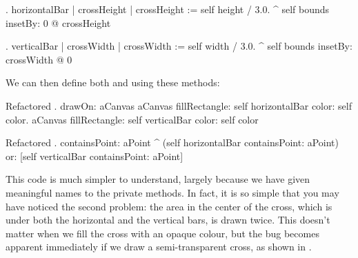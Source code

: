 \documentclass[a4paper,10pt,twoside]{book}
\begin{document}
\begin{method}{.}
horizontalBar
	| crossHeight |
	crossHeight := self height / 3.0.
	^ self bounds insetBy: 0 @ crossHeight
\end{method}

\begin{method}{.}
verticalBar
	| crossWidth |
	crossWidth := self width / 3.0.
	^ self bounds insetBy: crossWidth @ 0
\end{method}

\noindent
We can then define both  and  using these methods:

\begin{method}{Refactored .}
drawOn: aCanvas 
	aCanvas fillRectangle: self horizontalBar color: self color.
	aCanvas fillRectangle: self verticalBar color: self color
\end{method}

\begin{method}{Refactored .}
containsPoint: aPoint 
	^ (self horizontalBar containsPoint: aPoint)
		or: [self verticalBar containsPoint: aPoint]
\end{method}

This code is much simpler to understand, largely because we have given meaningful names to the private methods.
In fact, it is so simple that you may have noticed the second problem: the area in the center of the cross, which is under both the horizontal and the vertical bars, is drawn twice.  
This doesn't matter when we fill the cross with an opaque colour, but the bug becomes apparent immediately if we draw a semi-transparent cross, as shown in .
\end{document}
